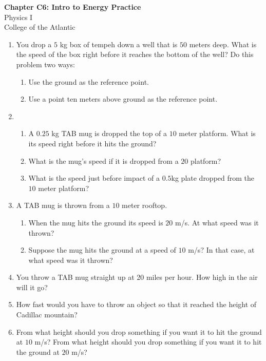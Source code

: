 \documentclass[14pt]{extarticle}
\begin{document}
\pagestyle{empty}

\begin{center}
{\Large {\bf Chapter C6: Intro to Energy Practice}}\\
\medskip
{\large {Physics I}}\\
\medskip
College of the Atlantic\\
\end{center}

\begin{enumerate}
\setlength{\itemsep}{5mm}

\item You drop a $5$ kg box of tempeh down a well that is $50$ meters
  deep.  What is the speed of the box right before it reaches the
  bottom of the well?  Do this problem two ways:
  \begin{enumerate}
    \item Use the ground as the reference point.
    \item Use a point ten meters above ground as the reference point.
\end{enumerate}


\item
  \begin{enumerate}
  \item A $0.25$ kg TAB mug is dropped the top of a $10$ meter
    platform.  What is its speed right before it hits the ground?
  \item What is the mug's speed if it is dropped from a $20$ platform?
  \item What is the speed just before impact of a $0.5$kg plate dropped from
    the $10$ meter platform? 
  \end{enumerate}

\item A TAB mug is thrown from a $10$ meter rooftop.  
  \begin{enumerate}
  \item When the mug hits the ground its speed is $20$ m/s.  At what
    speed was it thrown?
    \item Suppose the mug hits the ground at a speed of $10$ m/s?  In
      that case, at what speed was it thrown?
  \end{enumerate}

\item You throw a TAB mug straight up at 20 miles per hour.  How high
  in the air will it go?

\item How fast would you have to throw an object so that it reached
  the height of Cadillac mountain?
  
\item From what height should you drop something if you want it to hit
  the ground at $10$ m/s?  From what height should you drop something
  if you want it to hit the ground at $20$ m/s?

\end{enumerate}
\end{document}
